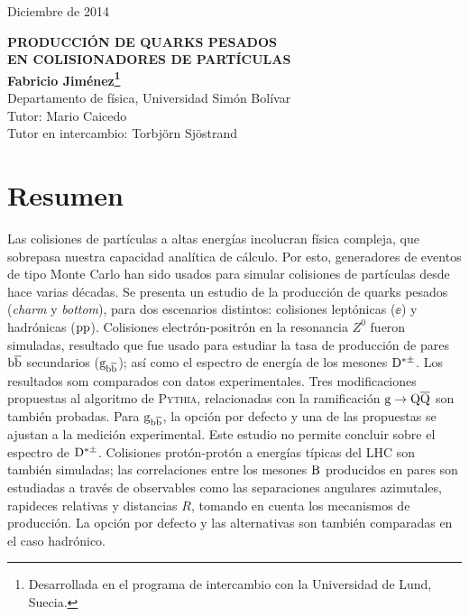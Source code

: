 \documentclass[a4paper,12pt]{article}
\begin{document}
\begin{titlepage}
\begin{flushright}
Diciembre de 2014\\
\end{flushright}
\vfill
\begin{center}

{\large\bf PRODUCCIÓN DE QUARKS PESADOS \\[3mm]
EN COLISIONADORES DE PARTÍCULAS}
\\[3cm]{\bf Fabricio Jiménez\footnote{Desarrollada en el programa de intercambio con la Universidad de Lund, Suecia.}}
\\[5mm]
{Departamento de física, Universidad Simón Bolívar}
\\[2cm]
{Tutor: Mario Caicedo \\ Tutor en intercambio: Torbj\"orn Sj\"ostrand}
\vfill
\section*{Resumen}
\end{center}
Las colisiones de partículas a altas energías incolucran física compleja, que sobrepasa nuestra capacidad analítica de cálculo. Por esto, generadores de eventos de tipo Monte Carlo han sido usados para simular colisiones de partículas desde hace varias décadas. Se presenta un estudio de la producción de quarks pesados (\textit{charm} y \textit{bottom}), para dos escenarios distintos: colisiones leptónicas ($\ee$) y hadrónicas (${\mathrm p}{\mathrm p}$). Colisiones electrón-positrón en la resonancia $Z^0$ fueron simuladas, resultado que fue usado para estudiar la tasa de producción de pares ${\mathrm b}\overline{\mathrm b}$ secundarios (${\mathrm g}_{{\mathrm b}\overline{\mathrm b}}$); así como el espectro de energía de los mesones ${\mathrm D}^{*\pm}$. Los resultados som comparados con datos experimentales. Tres modificaciones propuestas al algoritmo de \textsc{Pythia}, relacionadas con la ramificación ${\mathrm g}\to{\mathrm Q}\overline{\mathrm Q}$ son también probadas. Para ${\mathrm g}_{{\mathrm b}\overline{\mathrm b}}$, la opción por defecto y una de las propuestas se ajustan a la medición experimental. Este estudio no permite concluir sobre el espectro de ${\mathrm D}^{*\pm}$. Colisiones protón-protón a energías típicas del LHC son también simuladas; las correlaciones entre los mesones ${\mathrm B}$ producidos en pares son estudiadas a través de observables como las separaciones angulares azimutales, rapideces relativas y distancias $R$, tomando en cuenta los mecanismos de producción. La opción por defecto y las alternativas son también comparadas en el caso hadrónico.

\end{titlepage}
\end{document}
